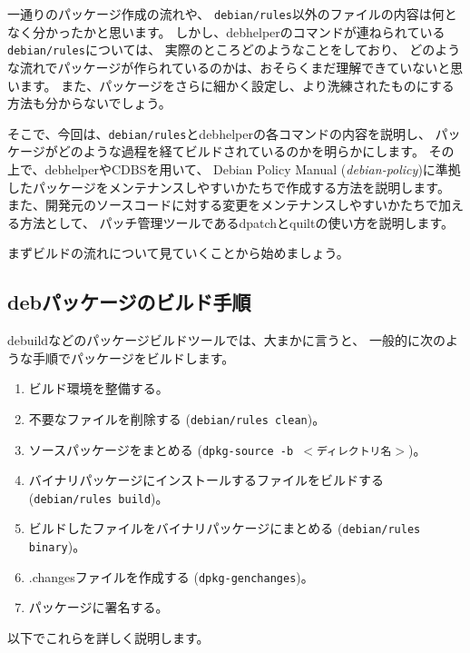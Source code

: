 \documentclass[mingoth,a4paper]{jsarticle}
\begin{document}
一通りのパッケージ作成の流れや、
\texttt{debian/rules}以外のファイルの内容は何となく分かったかと思います。
しかし、debhelperのコマンドが連ねられている\texttt{debian/rules}については、
実際のところどのようなことをしており、
どのような流れでパッケージが作られているのかは、おそらくまだ理解できていないと思います。
また、パッケージをさらに細かく設定し、より洗練されたものにする方法も分からないでしょう。

そこで、今回は、\texttt{debian/rules}とdebhelperの各コマンドの内容を説明し、
パッケージがどのような過程を経てビルドされているのかを明らかにします。
その上で、debhelperやCDBSを用いて、
Debian Policy Manual (\emph{debian-policy})に準拠したパッケージをメンテナンスしやすいかたちで作成する方法を説明します。
また、開発元のソースコードに対する変更をメンテナンスしやすいかたちで加える方法として、
パッチ管理ツールであるdpatchとquiltの使い方を説明します。

まずビルドの流れについて見ていくことから始めましょう。



\subsection{debパッケージのビルド手順}

debuildなどのパッケージビルドツールでは、大まかに言うと、
一般的に次のような手順でパッケージをビルドします。

\begin{enumerate}
 \item ビルド環境を整備する。
 \item 不要なファイルを削除する (\texttt{debian/rules clean})。
 \item ソースパッケージをまとめる (\texttt{dpkg-source -b $<$ディレクトリ名$>$})。
 \item バイナリパッケージにインストールするファイルをビルドする (\texttt{debian/rules build})。
 \item ビルドしたファイルをバイナリパッケージにまとめる (\texttt{debian/rules binary})。
 \item .changesファイルを作成する (\texttt{dpkg-genchanges})。
 \item パッケージに署名する。
\end{enumerate}

以下でこれらを詳しく説明します。
\end{document}
